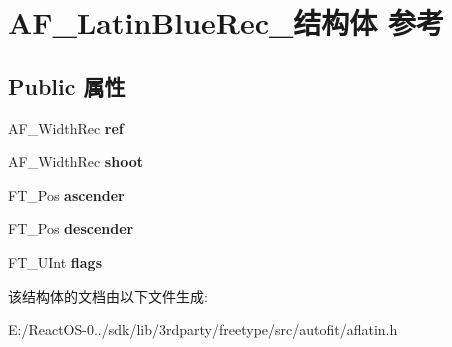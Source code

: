 \hypertarget{struct_a_f___latin_blue_rec__}{}\section{A\+F\+\_\+\+Latin\+Blue\+Rec\+\_\+结构体 参考}
\label{struct_a_f___latin_blue_rec__}
\subsection*{Public 属性}
\begin{DoxyCompactItemize}
\item 
\mbox{\label{struct_a_f___latin_blue_rec___aadfeeaaa93a60f7a28ca9ce86a745cde}} 
A\+F\+\_\+\+Width\+Rec {\bfseries ref}
\item 
\mbox{\label{struct_a_f___latin_blue_rec___adc90d39d01bb2a0825b8038bf1794143}} 
A\+F\+\_\+\+Width\+Rec {\bfseries shoot}
\item 
\mbox{\label{struct_a_f___latin_blue_rec___aa01fbafced0742995fd98e7694d4be41}} 
F\+T\+\_\+\+Pos {\bfseries ascender}
\item 
\mbox{\label{struct_a_f___latin_blue_rec___a8886118757fc823d514fc9dafb2f906b}} 
F\+T\+\_\+\+Pos {\bfseries descender}
\item 
\mbox{\label{struct_a_f___latin_blue_rec___a4033a3bd6e031af3fe36ab6ae48c40bf}} 
F\+T\+\_\+\+U\+Int {\bfseries flags}
\end{DoxyCompactItemize}


该结构体的文档由以下文件生成\+:\begin{DoxyCompactItemize}
\item 
E\+:/\+React\+O\+S-\/0../sdk/lib/3rdparty/freetype/src/autofit/aflatin.\+h\end{DoxyCompactItemize}
